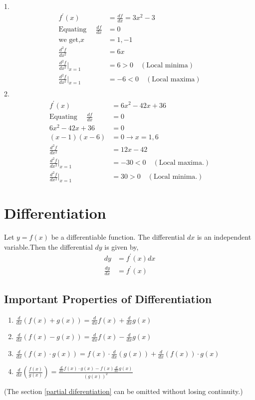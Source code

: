 \begin{answer}1.
	\begin{align*}
	f^{\prime}(x)&=\frac{df}{dx}=3x^{2}-3\\
	\text{Equating }\quad\frac{df}{dx} &=0\\
	\text{we get,}x&=1,-1\\
	\frac{d^{2}f}{dx^{2}}&=6x\\
	\frac{d^{2}f}{dx^{2}}\bigg\rvert_{x=1}&=6>0\quad(\text{Local minima})\\
	\frac{d^{2}f}{dx^{2}}\bigg\rvert_{x=1}&=-6<0\quad(\text{Local maxima})\\
	\end{align*}
	2.
	\begin{align*}
	 f^{\prime}(x)&=6 x^{2}-42 x+36\\
	 \text{Equating }\quad\frac{df}{dx} &=0\\
	  6 x^{2}-42 x+36&= 0\\
	  (x-1)(x-6)&=0 \rightarrow x=1,6 \\
	  \frac{d^{2}f}{dx^{2}}&=12 x-42\\
	  \frac{d^{2}f}{dx^{2}}\bigg\rvert_{x=1}&=-30<0\quad(\text{Local maxima.})\\
	  \frac{d^{2}f}{dx^{2}}\bigg\rvert_{x=1}&=30>0\quad(\text{Local minima.})
	  \end{align*}
	
\end{answer}

\section{Differentiation}
Let $y=f(x)$ be a differentiable function. The differential $d x$ is an independent variable.Then the differential $d y$ is given by,
\begin{align*}
d y&=f^{\prime}(x) d x\\
\frac{d y}{d x}&=f^{\prime}(x)
\end{align*}
\subsection{Important Properties of Differentiation} 
\begin{enumerate}
	\item $\frac{d}{d x}(f(x)+g(x))=\frac{d}{d x} f(x)+\frac{d}{d x} g(x)$
	\item $\frac{d}{d x}(f(x)-g(x))=\frac{d}{d x} f(x)-\frac{d}{d x} g(x)$
	\item $\frac{d}{d x}(f(x) \cdot g(x))=f(x) \cdot \frac{d}{d x}(g(x))+\frac{d}{d x}(f(x)) \cdot g(x)$
	\item $\frac{d}{d x}\left(\frac{f(x)}{g(x)}\right)=\frac{\frac{d}{d x} f(x) \cdot g(x)-f(x) \frac{d}{d x} g(x)}{(g(x))^{2}}$
\end{enumerate}
\textcolor{ocre}{(\large * The section \ref{partial diferentiation} can be omitted without losing continuity.)}
